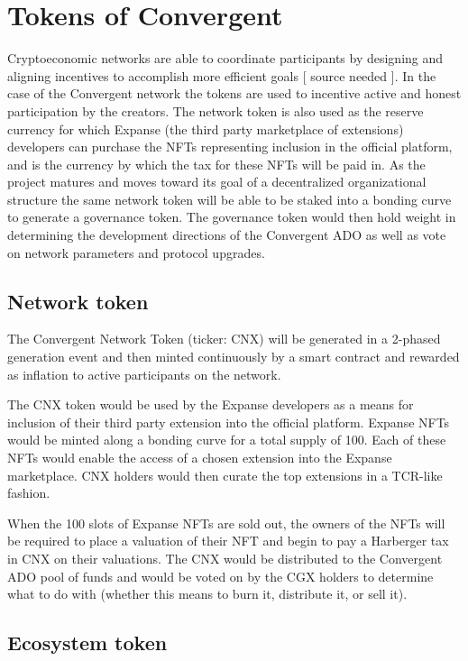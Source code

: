 \documentclass[a4paper, 10pt]{article}
\begin{document}
\section{Tokens of Convergent}

Cryptoeconomic networks are able to coordinate participants by designing and aligning incentives to accomplish more efficient goals [ source needed ]. In the case of the Convergent network the tokens are used to incentive active and honest participation by the creators. The network token is also used as the reserve currency for which Expanse (the third party marketplace of extensions) developers can purchase the NFTs representing inclusion in the official platform, and is the currency by which the tax for these NFTs will be paid in. As the project matures and moves toward its goal of a decentralized organizational structure the same network token will be able to be staked into a bonding curve to generate a governance token. The governance token would then hold weight in determining the development directions of the Convergent ADO as well as vote on network parameters and protocol upgrades. 

\subsection{Network token}

The Convergent Network Token (ticker: CNX) will be generated in a 2-phased generation event and then minted continuously by a smart contract and rewarded as inflation to active participants on the network. 

The CNX token would be used by the Expanse developers as a means for inclusion of their third party extension into the official platform. Expanse NFTs would be minted along a bonding curve for a total supply of 100. Each of these NFTs would enable the access of a chosen extension into the Expanse marketplace. CNX holders would then curate the top extensions in a TCR-like fashion. 

When the 100 slots of Expanse NFTs are sold out, the owners of the NFTs will be required to place a valuation of their NFT and begin to pay a Harberger tax in CNX on their valuations. The CNX would be distributed to the Convergent ADO pool of funds and would be voted on by the CGX holders to determine what to do with (whether this means to burn it, distribute it, or sell it). 

\subsection{Ecosystem token}
\end{document}
